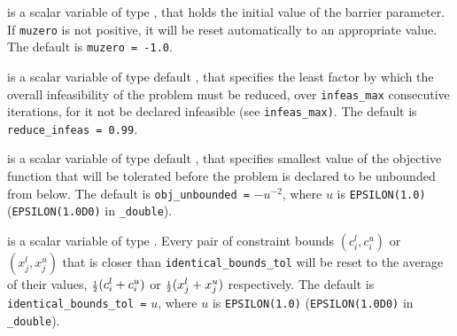 \begin{description}
  is a scalar variable of type \realdp, that holds the
initial value of the barrier parameter. If {\tt muzero} is
not positive, it will be reset automatically to an appropriate value.
The default is {\tt muzero = -1.0}.

  is a scalar variable of type default 
\realdp, that specifies the
least factor by which the overall infeasibility of the problem must be reduced,
over {\tt infeas\_max} consecutive iterations, 
for it not be declared infeasible (see {\tt infeas\_max)}.
The default is {\tt reduce\_infeas = 0.99}.

  is a scalar variable of type default 
\realdp, that specifies smallest
value of the objective function that will be tolerated before the problem
is declared to be unbounded from below.
The default is {\tt obj\_u\-nbounded =} $-u^{-2}$,
where $u$ is {\tt EPSILON(1.0)} ({\tt EPSILON(1.0D0)} in 
{\tt \fullpackagename\_double}).




is a scalar variable of type \realdp.
Every pair of constraint bounds 
$(c_{i}^{l}, c_{i}^{u})$ or $(x_{j}^{l}, x_{j}^{u})$
that is closer than {\tt identical\_bounds\_tol} 
will be reset to the average of their values,
${\scriptstyle \frac{1}{2}} (c_{i}^{l} + c_{i}^{u})$ or ${\scriptstyle \frac{1}{2}} (x_{j}^{l} + x_{j}^{u})$
respectively.
The default is {\tt identical\_bounds\_tol =} $u$,
where $u$ is {\tt EPSILON(1.0)} ({\tt EPSILON(1.0D0)} in 
{\tt \fullpackagename\_double}).


\end{description}
